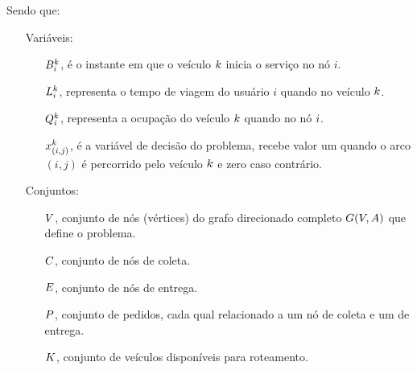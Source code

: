 Sendo que:
\begin{itemize}
  \item[]{Variáveis:}
  \begin{itemize}
    \item[$B_i^k$,] é o instante em que o veículo $k$ 
      inicia o serviço no nó $i$.
    \item[$L^k_i$,] representa o tempo de viagem do usuário 
      $i$ quando no veículo $k$.
    \item[$Q^{k}_i$,] representa a ocupação do veículo $k$
      quando no nó $i$.
    \item[$x_{(i, j)}^{k}$,] é a variável de decisão do problema, 
      recebe valor um quando o arco $(i, j)$ é percorrido pelo veículo 
      $k$ e zero caso contrário.
  \end{itemize}
  
\item[]{Conjuntos:}
  \begin{itemize}
    \item[$V$,] conjunto de nós (vértices) do grafo direcionado completo
      $G(V, A)$ que define o problema.
    \item[$C$,] conjunto de nós de coleta.
    \item[$E$,] conjunto de nós de entrega.
    \item[$P$,] conjunto de pedidos, cada qual relacionado a um nó de
      coleta e um de entrega.
    \item[$K$,] conjunto de veículos disponíveis para roteamento.
  \end{itemize}


\end{itemize}
